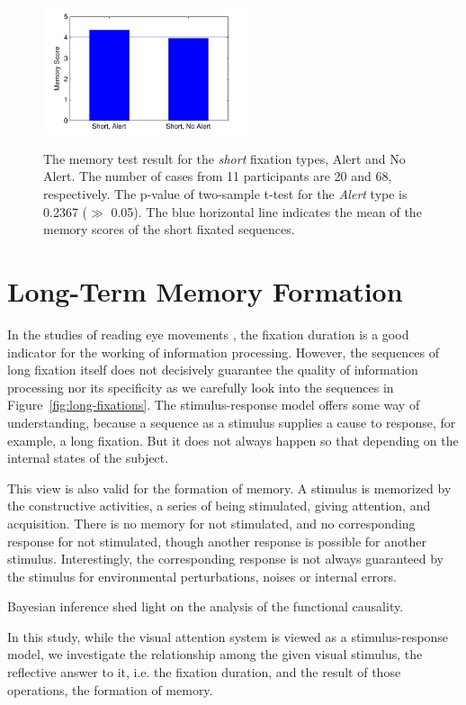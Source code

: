 \documentclass[10pt,letterpaper]{article}
\begin{document}
\begin{figure}
  \centerline{\includegraphics[width=60mm,height=44mm,trim=9mm 3mm 12mm 3mm]{./eps/memtest_short.pdf}}
  \caption{The memory test result for the \textit{short} fixation types, Alert and No Alert. The number of cases from 11 participants are 20 and 68, respectively. The p-value of two-sample t-test for the \textit{Alert} type is 0.2367 ($\gg$ 0.05). The blue horizontal line indicates the mean of the memory scores of the short fixated sequences.}
  \label{fig:memtest-short}
\end{figure}


\section{Long-Term Memory Formation}

In the studies of reading eye movements \cite{Rayner1998}, the fixation duration is a good indicator for the working of information processing. However, the sequences of long fixation itself does not decisively guarantee the quality of information processing nor its specificity as we carefully look into the sequences in Figure~\ref{fig:long-fixations}. The stimulus-response model offers some way of understanding, because a sequence as a stimulus supplies a cause to response, for example, a long fixation. But it does not always happen so that depending on the internal states of the subject.

This view is also valid for the formation of memory. A stimulus is memorized by the constructive activities, a series of being stimulated, giving attention, and acquisition. There is no memory for not stimulated, and no corresponding response for not stimulated, though another response is possible for another stimulus. Interestingly, the corresponding response is not always guaranteed by the stimulus for environmental perturbations, noises or internal errors.

Bayesian inference shed light on the analysis of the functional causality. 

In this study, while the visual attention system is viewed as a stimulus-response model, we investigate the relationship among the given visual stimulus, the reflective answer to it, i.e. the fixation duration, and the result of those operations, the formation of memory.
\end{document}
